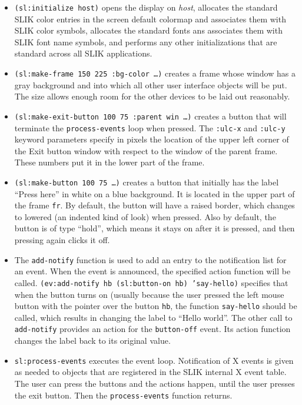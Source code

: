 \documentclass[twoside,openright,11pt]{report}
\newcommand{\tp}[1]{\texttt{#1}}
\begin{document}
\begin{itemize}

\item \tp{(sl:initialize host)} opens the display on \emph{host},
allocates the standard SLIK color entries in the screen default
colormap and associates them with SLIK color symbols, allocates the
standard fonts ans associates them with SLIK font name symbols, and
performs any other initializations that are standard across all SLIK
applications.

\item \tp{(sl:make-frame 150 225 :bg-color \ldots)} creates a frame
whose window has a gray background and into which all other user
interface objects will be put.  The size allows enough room for the
other devices to be laid out reasonably.

\item \tp{(sl:make-exit-button 100 75 :parent win \ldots)} creates a
button that will terminate the \tp{process-events} loop when pressed.
The \tp{:ulc-x} and \tp{:ulc-y} keyword parameters specify in pixels
the location of the upper left corner of the Exit button window with
respect to the window of the parent frame.  These numbers put it in
the lower part of the frame.

\item \tp{(sl:make-button 100 75 \ldots)} creates a button that
initially has the label ``Press here'' in white on a blue background.
It is located in the upper part of the frame \tp{fr}.  By default, the
button will have a raised border, which changes to lowered (an
indented kind of look) when pressed.  Also by default, the button is
of type ``hold'', which means it stays on after it is pressed, and
then pressing again clicks it off.
 
\item The \tp{add-notify} function is used to add an entry to the
notification list for an event.  When the event is announced, the
specified action function will be called.  \tp{(ev:add-notify hb
(sl:button-on hb) 'say-hello)} specifies that when the button turns on
(usually because the user pressed the left mouse button with the
pointer over the button \tp{hb}, the function \tp{say-hello} should be
called, which results in changing the label to ``Hello world''.  The
other call to \tp{add-notify} provides an action for the
\tp{button-off} event.  Its action function changes the label back to
its original value.

\item \tp{sl:process-events} executes the event loop.  Notification of
X events is given as needed to objects that are registered in the SLIK
internal X event table.  The user can press the buttons and the
actions happen, until the user presses the exit button.  Then the
\tp{process-events} function returns.


\end{itemize}
\end{document}
